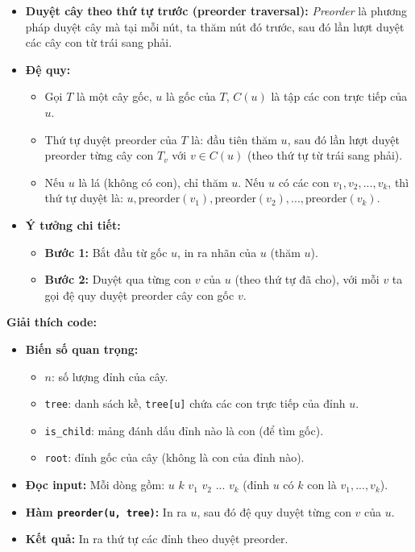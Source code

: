 \documentclass{article}
\begin{document}
\begin{itemize}
    \item \textbf{Duyệt cây theo thứ tự trước (preorder traversal):} \textit{Preorder} là phương pháp duyệt cây mà tại mỗi nút, ta thăm nút đó trước, sau đó lần lượt duyệt các cây con từ trái sang phải.
    \item \textbf{Đệ quy:}
    \begin{itemize}
        \item Gọi $T$ là một cây gốc, $u$ là gốc của $T$, $C(u)$ là tập các con trực tiếp của $u$.
        \item Thứ tự duyệt preorder của $T$ là: đầu tiên thăm $u$, sau đó lần lượt duyệt preorder từng cây con $T_v$ với $v \in C(u)$ (theo thứ tự từ trái sang phải).
        \item Nếu $u$ là lá (không có con), chỉ thăm $u$. Nếu $u$ có các con $v_1, v_2, ..., v_k$, thì thứ tự duyệt là: $u, \text{preorder}(v_1), \text{preorder}(v_2), ..., \text{preorder}(v_k)$.
    \end{itemize}
    \item \textbf{Ý tưởng chi tiết:}
    \begin{itemize}
        \item \textbf{Bước 1:} Bắt đầu từ gốc $u$, in ra nhãn của $u$ (thăm $u$).
        \item \textbf{Bước 2:} Duyệt qua từng con $v$ của $u$ (theo thứ tự đã cho), với mỗi $v$ ta gọi đệ quy duyệt preorder cây con gốc $v$.
    \end{itemize}
\end{itemize}

\textbf{Giải thích code:}

\begin{itemize}
    \item \textbf{Biến số quan trọng:}
    \begin{itemize}
        \item $n$: số lượng đỉnh của cây.
        \item \texttt{tree}: danh sách kề, \texttt{tree[u]} chứa các con trực tiếp của đỉnh $u$.
        \item \texttt{is\_child}: mảng đánh dấu đỉnh nào là con (để tìm gốc).
        \item \texttt{root}: đỉnh gốc của cây (không là con của đỉnh nào).
    \end{itemize}
    \item \textbf{Đọc input:} Mỗi dòng gồm: $u$ $k$ $v_1$ $v_2$ ... $v_k$ (đỉnh $u$ có $k$ con là $v_1, ..., v_k$).
    \item \textbf{Hàm \texttt{preorder(u, tree)}:} In ra $u$, sau đó đệ quy duyệt từng con $v$ của $u$.
    \item \textbf{Kết quả:} In ra thứ tự các đỉnh theo duyệt preorder.
\end{itemize}
\end{document}
